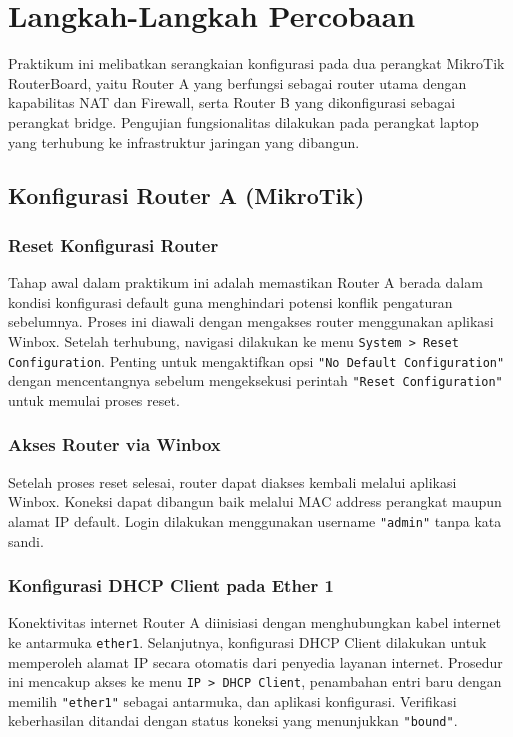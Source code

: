 \section{Langkah-Langkah Percobaan}

Praktikum ini melibatkan serangkaian konfigurasi pada dua perangkat MikroTik RouterBoard, yaitu Router A yang berfungsi sebagai router utama dengan kapabilitas NAT dan Firewall, serta Router B yang dikonfigurasi sebagai perangkat bridge. Pengujian fungsionalitas dilakukan pada perangkat laptop yang terhubung ke infrastruktur jaringan yang dibangun.

\subsection{Konfigurasi Router A (MikroTik)}

\subsubsection*{Reset Konfigurasi Router}
Tahap awal dalam praktikum ini adalah memastikan Router A berada dalam kondisi konfigurasi default guna menghindari potensi konflik pengaturan sebelumnya. Proses ini diawali dengan mengakses router menggunakan aplikasi Winbox. Setelah terhubung, navigasi dilakukan ke menu \texttt{System > Reset Configuration}. Penting untuk mengaktifkan opsi \texttt{"No Default Configuration"} dengan mencentangnya sebelum mengeksekusi perintah \texttt{"Reset Configuration"} untuk memulai proses reset.

\subsubsection*{Akses Router via Winbox}
Setelah proses reset selesai, router dapat diakses kembali melalui aplikasi Winbox. Koneksi dapat dibangun baik melalui MAC address perangkat maupun alamat IP default. Login dilakukan menggunakan username \texttt{"admin"} tanpa kata sandi.

\subsubsection*{Konfigurasi DHCP Client pada Ether 1}
Konektivitas internet Router A diinisiasi dengan menghubungkan kabel internet ke antarmuka \texttt{ether1}. Selanjutnya, konfigurasi DHCP Client dilakukan untuk memperoleh alamat IP secara otomatis dari penyedia layanan internet. Prosedur ini mencakup akses ke menu \texttt{IP > DHCP Client}, penambahan entri baru dengan memilih \texttt{"ether1"} sebagai antarmuka, dan aplikasi konfigurasi. Verifikasi keberhasilan ditandai dengan status koneksi yang menunjukkan \texttt{"bound"}.

